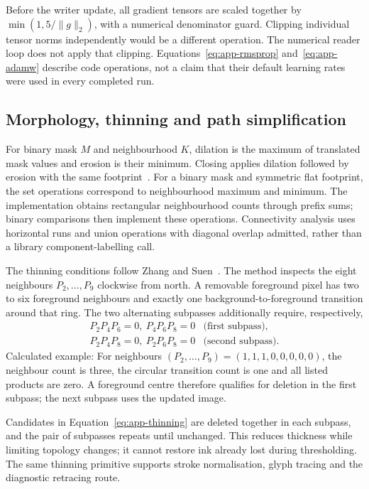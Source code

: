 Before the writer update, all gradient tensors are scaled together by $\min(1,5/\|g\|_2)$, with a numerical denominator guard. Clipping individual tensor norms independently would be a different operation. The numerical reader loop does not apply that clipping. Equations~\ref{eq:app-rmsprop} and~\ref{eq:app-adamw} describe code operations, not a claim that their default learning rates were used in every completed run.

\subsection{Morphology, thinning and path simplification}
For binary mask $M$ and neighbourhood $K$, dilation is the maximum of translated mask values and erosion is their minimum. Closing applies dilation followed by erosion with the same footprint~\cite[pp.~533, 541, Defs.~1, 36]{haralick1987}. For a binary mask and symmetric flat footprint, the set operations correspond to neighbourhood maximum and minimum. The implementation obtains rectangular neighbourhood counts through prefix sums; binary comparisons then implement these operations. Connectivity analysis uses horizontal runs and union operations with diagonal overlap admitted, rather than a library component-labelling call.


The thinning conditions follow Zhang and Suen~\cite[p.~237]{zhang1984}. The method inspects the eight neighbours $P_2,\ldots,P_9$ clockwise from north. A removable foreground pixel has two to six foreground neighbours and exactly one background-to-foreground transition around that ring. The two alternating subpasses additionally require, respectively,
\begin{equation}
\begin{array}{ll}
P_2P_4P_6=0,\ P_4P_6P_8=0 &\text{(first subpass)},\\
P_2P_4P_8=0,\ P_2P_6P_8=0 &\text{(second subpass)}.
\end{array}
\label{eq:app-thinning}
\end{equation}
Calculated example: For neighbours $(P_2,\ldots,P_9)=(1,1,1,0,0,0,0,0)$, the neighbour count is three, the circular transition count is one and all listed products are zero. A foreground centre therefore qualifies for deletion in the first subpass; the next subpass uses the updated image.

Candidates in Equation~\ref{eq:app-thinning} are deleted together in each subpass, and the pair of subpasses repeats until unchanged. This reduces thickness while limiting topology changes; it cannot restore ink already lost during thresholding. The same thinning primitive supports stroke normalisation, glyph tracing and the diagnostic retracing route.

